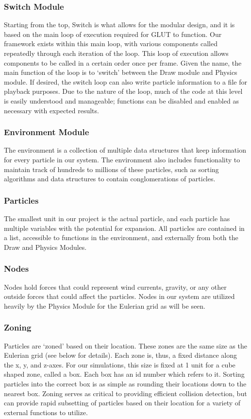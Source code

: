 \documentclass{acm_proc_article-sp}
\begin{document}
\subsubsection{Switch Module}
Starting from the top, Switch is what allows for the modular design, and it is based on the main loop of execution required for GLUT to function. Our framework exists within this main loop, with various components called repeatedly through each iteration of the loop. This loop of execution allows components to be called in a certain order once per frame. Given the name, the main function of the loop is to ‘switch’ between the Draw module and Physics module. If desired, the switch loop can also write particle information to a file for playback purposes. Due to the nature of the loop, much of the code at this level is easily understood and manageable; functions can be disabled and enabled as necessary with expected results. 

\subsubsection{Environment Module}
The environment is a collection of multiple data structures that keep information for every particle in our system. The environment also includes functionality to maintain track of hundreds to millions of these particles, such as sorting algorithms and data structures to contain conglomerations of particles.

\subsubsection{Particles}
The smallest unit in our project is the actual particle, and each particle has multiple variables with the potential for expansion. All particles are contained in a list, accessible to functions in the environment, and externally from both the Draw and Physics Modules.

\subsubsection{Nodes}
Nodes hold forces that could represent wind currents, gravity, or any other outside forces that could affect the particles. Nodes in our system are utilized heavily by the Physics Module for the Eulerian grid as will be seen.

\subsubsection{Zoning}
Particles are ‘zoned’ based on their location. These zones are the same size as the Eulerian grid (see below for details). Each zone is, thus, a fixed distance along the x, y, and z-axes. For our simulations, this size is fixed at 1 unit for a cube shaped zone, called a box. Each box has an id number which refers to it. Sorting particles into the correct box is as simple as rounding their locations down to the nearest box. Zoning serves as critical to providing efficient collision detection, but can provide rapid subsetting of particles based on their location for a variety of external functions to utilize.
\end{document}
